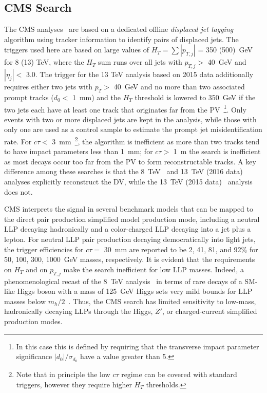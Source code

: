 \subsection{CMS Search}

The CMS analyses~\cite{CMS:2014wda,Sirunyan:2017jdo,Sirunyan:2018vlw} are based on a dedicated offline \emph{displaced jet tagging} algorithm using tracker information to identify pairs of displaced jets. The triggers used here are based on large values of $H_T = \sum |p_{T,j}|$ = 350 (500)~GeV for 8 (13) TeV, where the $H_T$ sum runs over all jets with $p_{T,j} >$ 40~GeV and $|\eta_j| <$ 3.0. The trigger for the 13 TeV analysis based on 2015 data additionally requires either two jets with $p_T >$ 40~GeV and no more than two associated prompt tracks ($d_0 <$ 1~mm) and the $H_T$ threshold is lowered to 350~GeV if the two jets each have at least one track that originates far from the PV~\footnote{In this case this is defined by requiring that the transverse impact parameter significance $|d_0|/\sigma_{d_0}$ have a value greater than 5.}. Only events with two or more displaced jets are kept in the analysis, while those with only one are used as a control sample to estimate the prompt jet misidentification rate. For $c \tau <$ 3~mm~\footnote{Note that in principle the low $c \tau$ regime can be covered with standard triggers, however they require higher $H_T$ thresholds.}, the algorithm is inefficient as more than two tracks tend to have impact parameters less than 1~mm; for $c \tau >$ 1~m the search is inefficient as most decays occur too far from the PV to form reconstructable tracks. A key difference among these searches is that the 8~TeV~\cite{CMS:2014wda} and 13~TeV (2016 data)~\cite{Sirunyan:2018vlw} analyses explicitly reconstruct the DV, while the 13~TeV (2015 data)~\cite{Sirunyan:2017jdo} analysis does not.

CMS interprets the signal in several benchmark models that can be mapped to the direct pair production simplified model production mode, including a neutral LLP decaying hadronically and a color-charged LLP decaying into a jet plus a lepton. For neutral LLP pair production decaying democratically into light jets, the trigger efficiencies for $c \tau =$ 30~mm are reported to be 2, 41, 81, and 92\% for 50, 100, 300, 1000~GeV masses, respectively. It is evident that the requirements on $H_T$ and on $p_{T,j}$ make the search inefficient for low LLP masses. Indeed, a phenomenological recast of the 8~TeV analysis~\cite{CMS:2014wda} in terms of rare decays of a SM-like Higgs boson with a mass of 125~GeV Higgs sets very mild bounds for LLP masses below $m_h / 2$~\cite{Csaki:2015fba}. Thus, the CMS search has limited sensitivity to low-mass, hadronically decaying LLPs through the Higgs, $Z'$, or charged-current simplified production modes.

